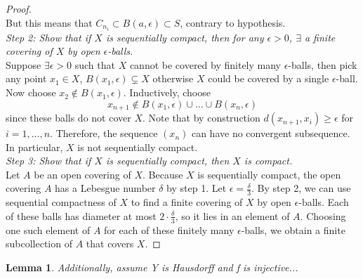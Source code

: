 \documentclass[article,11pt, reqno]{article}
\newtheorem*{lemma}{Lemma}
\theoremstyle{remark}
\newcommand{\<}{\langle}
\renewcommand{\>}{\rangle}
\newcommand{\ex}{\exists}
\begin{document}
\begin{proof}
\\
But this means that $C_{n_i} \subset B(a,\epsilon)\subset S$, contrary to hypothesis.\\
\textit{Step 2: Show that if $X$ is sequentially compact, then for any $\epsilon > 0$, $\exists$ a finite covering of $X$ by open $\epsilon$-balls.}\\
Suppose $\ex\epsilon > 0$ such that $X$ cannot be covered by finitely many $\epsilon$-balls, then pick any point $x_1\in X$, $B(x_1,\epsilon)\subsetneq X$ otherwise $X$ could be covered by a single $\epsilon$-ball. Now choose $x_2\notin B(x_1,\epsilon)$. Inductively, choose 
$$
    x_{n+1}\notin B(x_1,\epsilon)\cup\dots\cup B(x_n,\epsilon)
$$
since these balls do not cover $X$. Note that by construction $d(x_{n+1},x_i)\geq\epsilon $ for $i = 1,\dots, n$. Therefore, the sequence $(x_n)$ can have no convergent subsequence. In particular, $X$ is not sequentially compact.\\
\textit{Step 3: Show that if $X$ is sequentially compact, then $X$ is compact.}\\
Let $A$ be an open covering of $X$. Because $X$ is sequentially compact, the open covering $A$ has a Lebesgue number $\delta$ by step 1. Let $\epsilon=\frac{\delta}{3}$. By step 2, we can use sequential compactness of $X$ to find a finite covering of $X$ by open $\epsilon$-balls. Each of these balls has diameter at most $2\cdot\frac{\delta}{3}$, so it lies in an element of $A$. Choosing one such element of $A$ for each of these finitely many $\epsilon$-balls, we obtain a finite subcollection of $A$ that covers $X$.
\end{proof}
\begin{lemma}
    Additionally, assume Y is Hausdorff and f is injective...
\end{lemma}
\end{document}
